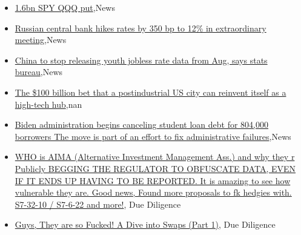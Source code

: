 \documentclass{article}%
\begin{document}
%
\begin{itemize}%
\item%
\href{https://reddit.com/r/StockMarket/comments/15rb4ni/16bn\_spy\_qqq\_put/}{1.6bn SPY QQQ put},News%
\item%
\href{https://reddit.com/r/Economics/comments/15rm8c3/russian\_central\_bank\_hikes\_rates\_by\_350\_bp\_to\_12/}{Russian central bank hikes rates by 350 bp to 12\% in extraordinary meeting},News%
\item%
\href{https://reddit.com/r/Economics/comments/15rfowh/china\_to\_stop\_releasing\_youth\_jobless\_rate\_data/}{China to stop releasing youth jobless rate data from Aug, says stats bureau},News%
\item%
\href{https://reddit.com/r/Economics/comments/15ra4ie/the\_100\_billion\_bet\_that\_a\_postindustrial\_us\_city/}{The \$100 billion bet that a postindustrial US city can reinvent itself as a high-tech hub},nan%
\item%
\href{https://reddit.com/r/Economics/comments/15r9hvy/biden\_administration\_begins\_canceling\_student/}{Biden administration begins canceling student loan debt for 804,000 borrowers  The move is part of an effort to fix administrative failures},News%
\item%
\href{https://reddit.com/r/Superstonk/comments/15rqgu0/who\_is\_aima\_alternative\_investment\_management\_ass/}{WHO is AIMA (Alternative Investment Management Ass.) and why they r Publicly BEGGING THE REGULATOR TO OBFUSCATE DATA, EVEN IF IT ENDS UP HAVING TO BE REPORTED. It is amazing to see how vulnerable they are. Good news, Found more proposals to fk hedgies with. S7-32-10 / S7-6-22 and more!}, Due Diligence%
\item%
\href{https://reddit.com/r/Superstonk/comments/15rir8h/guys\_they\_are\_so\_fucked\_a\_dive\_into\_swaps\_part\_1/}{Guys, They are so Fucked! A Dive into Swaps (Part 1)}, Due Diligence%
\end{itemize}%
\end{document}
